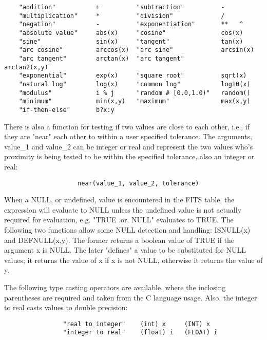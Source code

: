 \documentclass[11pt]{article}
\begin{document}
 
\begin{verbatim}
    "addition"           +          "subtraction"          -
    "multiplication"     *          "division"             /
    "negation"           -          "exponentiation"       **   ^
    "absolute value"     abs(x)     "cosine"               cos(x)
    "sine"               sin(x)     "tangent"              tan(x)
    "arc cosine"         arccos(x)  "arc sine"             arcsin(x)
    "arc tangent"        arctan(x)  "arc tangent"          arctan2(x,y)
    "exponential"        exp(x)     "square root"          sqrt(x)
    "natural log"        log(x)     "common log"           log10(x)
    "modulus"            i % j      "random # [0.0,1.0)"   random()
    "minimum"            min(x,y)   "maximum"              max(x,y)
    "if-then-else"       b?x:y
\end{verbatim}


There is also a function for testing if  two  values  are  close  to
each  other,  i.e.,  if  they are "near" each other to within a user
specified tolerance. The  arguments,  value\_1  and  value\_2  can  be
integer  or  real  and  represent  the two values who's proximity is
being tested to be within the specified tolerance, also  an  integer
or real:

\begin{verbatim}
                    near(value_1, value_2, tolerance)
\end{verbatim}

When  a  NULL, or undefined, value is encountered in the FITS table,
the expression will evaluate to NULL unless the undefined  value  is
not   actually   required  for  evaluation,  e.g. "TRUE  .or.  NULL"
evaluates to TRUE. The  following  two  functions  allow  some  NULL
detection  and  handling:  ISNULL(x)  and  DEFNULL(x,y).  The former
returns a boolean value of TRUE if the  argument  x  is  NULL.   The
later  "defines"  a  value  to  be  substituted  for NULL values; it
returns the value of x if x is not NULL, otherwise  it  returns  the
value of y.

The  following  type  casting  operators  are  available,  where the
inclosing parentheses are required and taken  from  the  C  language
usage. Also, the integer to real casts values to double precision:

\begin{verbatim}
                "real to integer"    (int) x     (INT) x
                "integer to real"    (float) i   (FLOAT) i
\end{verbatim}
\end{document}
